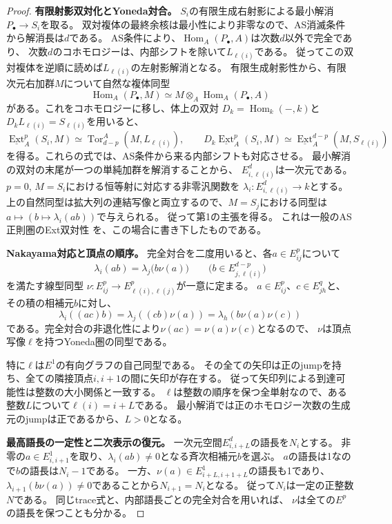 \documentclass[11pt,a4paper]{ltjsarticle}
\theoremstyle{definition}
\begin{document}
\begin{proof}
\par\smallskip\noindent\textbf{有限射影双対化とYoneda対合。}\quad
$S_i$の有限生成右射影による最小解消$P_\bullet\to S_i$を取る。
双対複体の最終余核は最小性により非零なので、AS消滅条件から解消長は$d$である。
AS条件により、$\operatorname{Hom}_A(P_\bullet,A)$は次数$d$以外で完全であり、
次数$d$のコホモロジーは、内部シフトを除いて$L_{\ell(i)}$である。
従ってこの双対複体を逆順に読めば$L_{\ell(i)}$の左射影解消となる。
有限生成射影性から、有限次元右加群$M$について自然な複体同型
\[
 \operatorname{Hom}_A(P_\bullet,M)
 \simeq M\otimes_A\operatorname{Hom}_A(P_\bullet,A)
\]
がある。これをコホモロジーに移し、体上の双対
$D_k=\operatorname{Hom}_k(-,k)$と$D_kL_{\ell(i)}=S_{\ell(i)}$を用いると、
\[
 \underline{\operatorname{Ext}}^p_A(S_i,M)
 \simeq\operatorname{Tor}_{d-p}^A(M,L_{\ell(i)}),
 \qquad
 D_k\underline{\operatorname{Ext}}^p_A(S_i,M)
 \simeq\underline{\operatorname{Ext}}^{d-p}_A(M,S_{\ell(i)})
\]
を得る。これらの式では、AS条件から来る内部シフトも対応させる。
最小解消の双対の末尾が一つの単純加群を解消することから、
$E^d_{i,\ell(i)}$は一次元である。
$p=0$, $M=S_i$における恒等射に対応する非零汎関数を
$\lambda_i:E^d_{i,\ell(i)}\to k$とする。
上の自然同型は拡大列の連結写像と両立するので、$M=S_j$における同型は
$a\mapsto(b\mapsto\lambda_i(ab))$で与えられる。
従って第1の主張を得る。
これは一般のAS正則圏のExt双対性
\cite[Lemma~6.1(b), Theorem~6.2(b)]{MVS}を、この場合に書き下したものである。

\par\smallskip\noindent\textbf{Nakayama対応と頂点の順序。}\quad
完全対合を二度用いると、各$a\in E^p_{ij}$について
\[
 \lambda_i(ab)=\lambda_j\bigl(b\nu(a)\bigr)
 \qquad\bigl(b\in E^{d-p}_{j,\ell(i)}\bigr)
\]
を満たす線型同型
$\nu:E^p_{ij}\to E^p_{\ell(i),\ell(j)}$が一意に定まる。
$a\in E^p_{ij}$、$c\in E^q_{jh}$と、その積の相補元$b$に対し、
\[
 \lambda_i((ac)b)
 =\lambda_j((cb)\nu(a))
 =\lambda_h(b\nu(a)\nu(c))
\]
である。完全対合の非退化性により$\nu(ac)=\nu(a)\nu(c)$となるので、
$\nu$は頂点写像$\ell$を持つYoneda圏の同型である。

特に$\ell$は$E^1$の有向グラフの自己同型である。
その全ての矢印は正のjumpを持ち、全ての隣接頂点$i,i+1$の間に矢印が存在する。
従って矢印列による到達可能性は整数の大小関係と一致する。
$\ell$は整数の順序を保つ全単射なので、ある整数$L$について$\ell(i)=i+L$である。
最小解消では正のホモロジー次数の生成元のjumpは正であるから、$L>0$となる。

\par\smallskip\noindent\textbf{最高語長の一定性と二次表示の復元。}\quad
一次元空間$E^d_{i,i+L}$の語長を$N_i$とする。
非零の$a\in E^1_{i,i+1}$を取り、$\lambda_i(ab)\ne0$となる斉次相補元$b$を選ぶ。
$a$の語長は1なので$b$の語長は$N_i-1$である。
一方、$\nu(a)\in E^1_{i+L,i+1+L}$の語長も1であり、
$\lambda_{i+1}(b\nu(a))\ne0$であることから$N_{i+1}=N_i$となる。
従って$N_i$は一定の正整数$N$である。
同じtrace式と、内部語長ごとの完全対合を用いれば、
$\nu$は全ての$E^p$の語長を保つことも分かる。


\end{proof}
\end{document}
